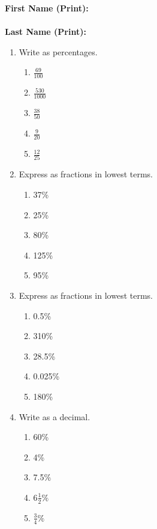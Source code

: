 \documentclass[fleqn, a4paper, 11pt]{article}
\begin{document}
\parbox[b][3cm][c]{12cm}{

	\textbf{First Name (Print):} \hrulefill \\
	\\
	\textbf{Last Name (Print):}  \hrulefill }

\begin{enumerate}
	\item Write as percentages.
	      \begin{enumerate}[itemsep=0.5in]
		      \item $\frac{69}{100}$
		      \item $\frac{530}{1000}$
		      \item $\frac{38}{50}$
		      \item $\frac{9}{20}$
		      \item $\frac{12}{25}$
	      \end{enumerate}
	      \vspace{1in}

	\item Express as fractions in lowest terms.
	      \begin{enumerate}[itemsep=0.5in]
		      \item 37\%
		      \item 25\%
		      \item 80\%
		      \item 125\%
		      \item 95\%
	      \end{enumerate}

	      \newpage

	\item Express as fractions in lowest terms.
	      \begin{enumerate}[itemsep=0.7in]
		      \item 0.5\%
		      \item 310\%
		      \item 28.5\%
		      \item 0.025\%
		      \item 180\%

	      \end{enumerate}
	      \vspace{1in}

	\item Write as a decimal.
	      \begin{enumerate}[itemsep=0.7in]
		      \item 60\%
		      \item 4\%
		      \item 7.5\%
		      \item $6\frac{1}{2}\%$
		      \item $\frac{3}{4}\%$
	      \end{enumerate}
	      \vspace{1in}
	      \newpage


\end{enumerate}
\end{document}
